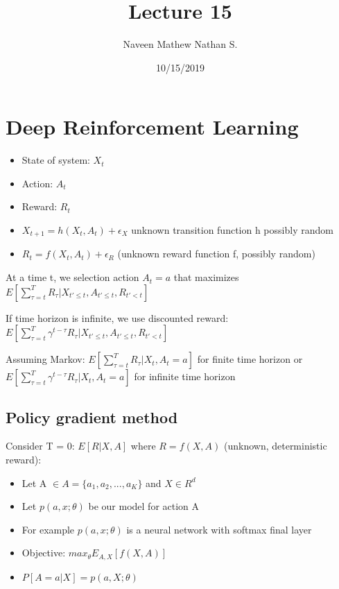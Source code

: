 \documentclass[]{article}
\title{Lecture 15}
\author{Naveen Mathew Nathan S.}
\date{10/15/2019}
\providecommand{\tightlist}{%
  \setlength{\itemsep}{0pt}\setlength{\parskip}{0pt}}
\begin{document}
\maketitle

\hypertarget{deep-reinforcement-learning}{%
\section{Deep Reinforcement
Learning}\label{deep-reinforcement-learning}}

\begin{itemize}
\tightlist
\item
  State of system: \(X_t\)
\item
  Action: \(A_t\)
\item
  Reward: \(R_t\)
\item
  \(X_{t+1} = h(X_t, A_t) + \epsilon_X\) unknown transition function h
  possibly random
\item
  \(R_t = f(X_t, A_t) + \epsilon_R\) (unknown reward function f,
  possibly random)
\end{itemize}

At a time t, we selection action \(A_t = a\) that maximizes
\(E[\sum_{\tau = t}^{T} R_\tau | X_{t' \le t}, A_{t' \le t}, R_{t' < t}]\)

If time horizon is infinite, we use discounted reward:
\(E[\sum_{\tau = t}^{T} \gamma^{t-\tau}R_\tau | X_{t' \le t}, A_{t' \le t}, R_{t' < t}]\)

Assuming Markov: \(E[\sum_{\tau = t}^{T} R_\tau | X_t, A_t=a]\) for
finite time horizon or
\(E[\sum_{\tau = t}^{T} \gamma^{t-\tau}R_\tau | X_t, A_t=a]\) for
infinite time horizon

\hypertarget{policy-gradient-method}{%
\subsection{Policy gradient method}\label{policy-gradient-method}}

Consider T = 0: \(E[R | X, A]\) where \(R = f(X, A)\) (unknown,
deterministic reward):

\begin{itemize}
\tightlist
\item
  Let A \(\in A = \{a_1, a_2, ..., a_K\}\) and \(X \in R^d\)
\item
  Let \(p(a, x; \theta)\) be our model for action A
\item
  For example \(p(a, x; \theta)\) is a neural network with softmax final
  layer
\item
  Objective: \(max_\theta E_{A, X}[f(X, A)]\)
\item
  \(P[A = a|X] = p(a, X; \theta)\)
\end{itemize}
\end{document}

